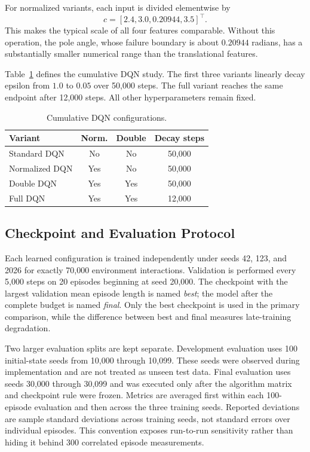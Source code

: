 \documentclass[conference]{IEEEtran}
\begin{document}
For normalized variants, each input is divided elementwise by
\begin{equation}
c=[2.4,3.0,0.20944,3.5]^\top.
\end{equation}
This makes the typical scale of all four features comparable. Without this
operation, the pole angle, whose failure boundary is about $0.20944$ radians,
has a substantially smaller numerical range than the translational features.

Table~\ref{tab:dqnvariants} defines the cumulative DQN study. The first three
variants linearly decay epsilon from $1.0$ to $0.05$ over 50,000 steps. The
full variant reaches the same endpoint after 12,000 steps. All other
hyperparameters remain fixed.

\begin{table}[t]
\caption{Cumulative DQN configurations.}
\label{tab:dqnvariants}
\centering
\small
\begin{tabular}{lccc}
\toprule
Variant & Norm. & Double & Decay steps\\
\midrule
Standard DQN & No & No & 50,000\\
Normalized DQN & Yes & No & 50,000\\
Double DQN & Yes & Yes & 50,000\\
Full DQN & Yes & Yes & 12,000\\
\bottomrule
\end{tabular}
\end{table}

\subsection{Checkpoint and Evaluation Protocol}

Each learned configuration is trained independently under seeds 42, 123, and
2026 for exactly 70,000 environment interactions. Validation is performed
every 5,000 steps on 20 episodes beginning at seed 20,000. The checkpoint with
the largest validation mean episode length is named \emph{best}; the model
after the complete budget is named \emph{final}. Only the best checkpoint is
used in the primary comparison, while the difference between best and final
measures late-training degradation.

Two larger evaluation splits are kept separate. Development evaluation uses
100 initial-state seeds from 10,000 through 10,099. These seeds were observed
during implementation and are not treated as unseen test data. Final
evaluation uses seeds 30,000 through 30,099 and was executed only after the
algorithm matrix and checkpoint rule were frozen. Metrics are averaged first
within each 100-episode evaluation and then across the three training seeds.
Reported deviations are sample standard deviations across training seeds,
not standard errors over individual episodes. This convention exposes
run-to-run sensitivity rather than hiding it behind 300 correlated episode
measurements.
\end{document}
